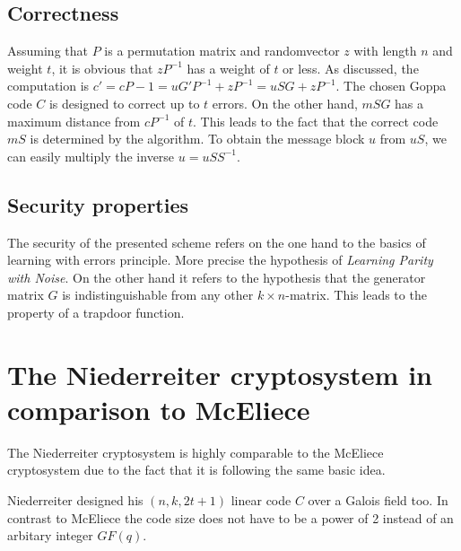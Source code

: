 \subsection*{Correctness}
Assuming that $P$ is a permutation matrix and randomvector $z$ with length $n$ and weight $t$, it is obvious that $zP^{-1}$ has a weight of $t$ or less.
As discussed, the computation is $c' = c P - 1 = uG'P^{-1} + zP^{-1} = uSG + z P^{-1}$.
The chosen Goppa code $C$ is designed to correct up to $t$ errors. On the other hand, $mSG$ has a maximum distance from $cP^{-1}$ of $t$. This leads to the fact that the correct code $mS$ is determined by the algorithm. 
To obtain the message block $u$ from $uS$, we can easily multiply the inverse $u = uSS^{-1}$\cite{wiki:mcelice}.

\subsection*{Security properties}
The security of the presented scheme refers on the one hand to the basics of learning with errors principle. More precise the hypothesis of \textit{Learning Parity with Noise}\cite{pietrzak2012cryptography}. 
On the other hand it refers to the hypothesis that the generator matrix $G$ is indistinguishable from any other $k \times n$-matrix. This leads to the property of a trapdoor function.


\section{The Niederreiter cryptosystem in comparison to McEliece}
\label{niederreither}
The Niederreiter cryptosystem is highly comparable to the McEliece cryptosystem due to the fact that it is following the same basic idea. 

Niederreiter designed his $(n, k, 2t + 1)$ linear code $C$ over a Galois field too. In contrast to McEliece the code size does not have to be a power of 2 instead of an arbitary integer $GF(q)$. 

